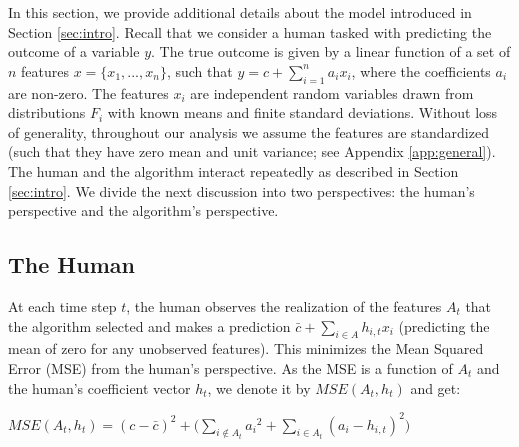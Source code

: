 In this section, we provide additional details about the model introduced in Section \ref{sec:intro}. 
Recall that we consider a human tasked with predicting the outcome of a variable $y$. The true outcome is given by a linear function of a set of $n$ features $x = \{x_1, ..., x_n\}$,  such that $y = c + \sum_{i=1}^n a_i x_i$, where the coefficients $a_i$ are non-zero. %
The features $x_i$ are independent random variables drawn from distributions $F_i$ with known means and finite standard deviations. Without loss of generality, throughout our analysis we assume the features are standardized (such that they have zero mean and unit variance; see Appendix \ref{app:general}). The human and the algorithm interact repeatedly as described in Section \ref{sec:intro}.
We divide the next discussion into two perspectives: the human's perspective and the algorithm's perspective.


\subsection{The Human} \label{sec:model-human} At each time step $t$, the human observes the realization of the features $A_t$ that the algorithm selected and makes a prediction $\bar c + \sum_{i \in A} h_{i,t} x_i$ (predicting the mean of zero for any unobserved features). This minimizes the Mean Squared Error (MSE) from the human's perspective. As the MSE is a function of $A_t$ and the human's coefficient vector $h_t$, we denote it by $MSE(A_t,h_t)$ and get:


\begin{claim} \label{clm:huma-mse}
    $MSE(A_t,h_t) = (c-\bar c)^2 + \big(\sum_{i \notin A_t} {a_i}^2 + \sum_{i \in A_t} (a_i - h_{i,t})^2 \big)$
\end{claim}


